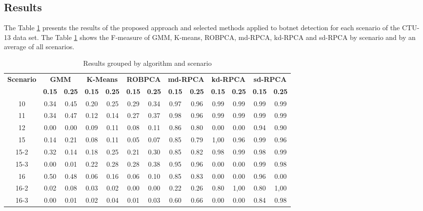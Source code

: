 \subsection{Results}
\label{sec:4_results}

The Table \ref{tab:4.02} presents the results of the proposed approach and selected methods applied to botnet detection for each scenario of the CTU-13 data set. The Table \ref{tab:4.02} shows the F-measure of GMM, K-means, ROBPCA, md-RPCA, kd-RPCA and sd-RPCA by scenario and by an average of all scenarios.

\begin{table}[h!]
  \centering
  \scriptsize
  \caption{Results grouped by algorithm and scenario}
  \label{tab:4.02}
  \begin{tabular}{ c|c c|c c|c c|c c|c c|c c }
	\toprule
	\multirow{2}{*}{\textbf{Scenario}}   &\multicolumn{2}{c}{\textbf{GMM}} &\multicolumn{2}{c}{\textbf{K-Means}} &\multicolumn{2}{c}{\textbf{ROBPCA}} &\multicolumn{2}{c}{\textbf{md-RPCA}} &\multicolumn{2}{c}{\textbf{kd-RPCA}} &\multicolumn{2}{c}{\textbf{sd-RPCA}}\\ 
			\hhline{~------------}
			&\textbf{0.15} &\textbf{0.25} &\textbf{0.15} &\textbf{0.25} &\textbf{0.15} &\textbf{0.25} &\textbf{0.15} &\textbf{0.25} &\textbf{0.15} &\textbf{0.25} &\textbf{0.15} &\textbf{0.25}\\
	\midrule
		10 & 0.34 & 0.45 & 0.20 & 0.25 & 0.29 & 0.34 & 0.97 & 0.96 & 0.99 & 0.99 & 0.99 & 0.99 \\ \hline
		11 & 0.34 & 0.47 & 0.12 & 0.14 & 0.27 & 0.37 & 0.98 & 0.96 & 0.99 & 0.99 & 0.99 & 0.99 \\ \hline
		12 & 0.00 & 0.00 & 0.09 & 0.11 & 0.08 & 0.11 & 0.86 & 0.80 & 0.00 & 0.00 & 0.94 & 0.90 \\ \hline
		15 & 0.14 & 0.21 & 0.08 & 0.11 & 0.05 & 0.07 & 0.85 & 0.79 & 1,00 & 0.96 & 0.99 & 0.96 \\ \hline
		15-2 & 0.32 & 0.14 & 0.18 & 0.25 & 0.21 & 0.30 & 0.85 & 0.82 & 0.98 & 0.99 & 0.98 & 0.99 \\ \hline
		15-3 & 0.00 & 0.01 & 0.22 & 0.28 & 0.28 & 0.38 & 0.95 & 0.96 & 0.00 & 0.00 & 0.99 & 0.98 \\ \hline
		16 & 0.50 & 0.48 & 0.06 & 0.16 & 0.06 & 0.10 & 0.85 & 0.83 & 0.00 & 0.00 & 0.96 & 0.00 \\ \hline
		16-2 & 0.02 & 0.08 & 0.03 & 0.02 & 0.00 & 0.00 & 0.22 & 0.26 & 0.80 & 1,00 & 0.80 & 1,00 \\ \hline
		16-3 & 0.00 & 0.01 & 0.02 & 0.04 & 0.01 & 0.03 & 0.60 & 0.66 & 0.00 & 0.00 & 0.84 & 0.98 \\ \hline

\end{tabular}
\end{table}
